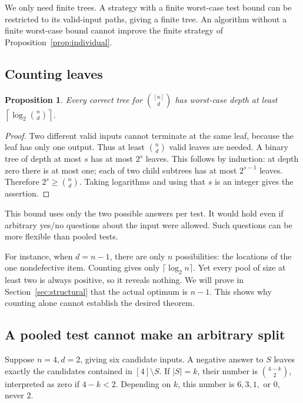 \documentclass[11pt]{article}
\newtheorem{proposition}[theorem]{Proposition}
\theoremstyle{definition}
\theoremstyle{remark}
\numberwithin{equation}{section}
\begin{document}
We only need finite trees. A strategy with a finite worst-case test
bound can be restricted to its valid-input paths, giving a finite
tree. An algorithm without a finite worst-case bound cannot improve
the finite strategy of Proposition~\ref{prop:individual}.

\subsection{Counting leaves}

\begin{proposition}\label{prop:counting}
Every correct tree for \(\binom{[n]}d\) has worst-case depth at least
\(\left\lceil\log_2\binom nd\right\rceil\).
\end{proposition}
\begin{proof}
Two different valid inputs cannot terminate at the same leaf, because
the leaf has only one output. Thus at least \(\binom nd\) valid
leaves are needed.
A binary tree of depth at most \(s\) has at most \(2^s\) leaves.
This follows by induction: at depth zero there is at most one;
each of two child subtrees has at most \(2^{s-1}\) leaves.
Therefore \(2^s\ge\binom nd\). Taking logarithms and using that
\(s\) is an integer gives the assertion.
\end{proof}

This bound uses only the two possible answers per test. It would hold
even if arbitrary yes/no questions about the input were allowed.
Such questions can be more flexible than pooled tests.

For instance, when \(d=n-1\), there are only \(n\) possibilities:
the locations of the one nondefective item. Counting gives only
\(\lceil\log_2 n\rceil\). Yet every pool of size at least two is
always positive, so it reveals nothing. We will prove in
Section~\ref{sec:structural} that the actual optimum is \(n-1\).
This shows why counting alone cannot establish the desired theorem.

\subsection{A pooled test cannot make an arbitrary split}

Suppose \(n=4,d=2\), giving six candidate inputs.
A negative answer to \(S\) leaves exactly the candidates contained
in \([4]\setminus S\). If \(|S|=k\), their number is
\(\binom{4-k}{2}\), interpreted as zero if \(4-k<2\).
Depending on \(k\), this number is \(6,3,1,\) or \(0\), never \(2\).
\end{document}
